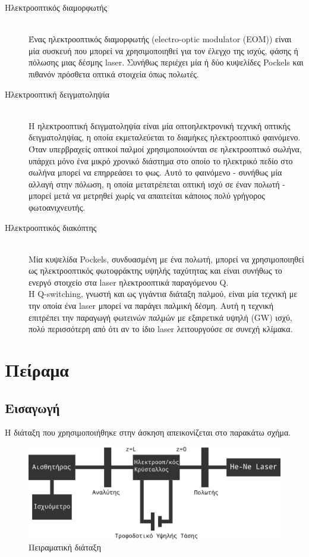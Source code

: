 \documentclass[a4paper,11pt,titlepage]{article}
\begin{document}
\begin{description}
\item[Ηλεκτροοπτικός διαμορφωτής] \hfill \\
Ένας ηλεκτροοπτικός διαμορφωτής (electro-optic modulator (EOM)) είναι μία συσκευή που μπορεί να χρησιμοποιηθεί για τον έλεγχο της ισχύς, φάσης ή πόλωσης μιας δέσμης laser. Συνήθως περιέχει μία ή δύο κυψελίδες Pockels και πιθανόν πρόσθετα οπτικά στοιχεία όπως πολωτές.

\item[Ηλεκτροοπτική δειγματοληψία] \hfill \\
Η ηλεκτροοπτική δειγματοληψία είναι μία οπτοηλεκτρονική τεχνική οπτικής δειγματοληψίας, η οποία εκμεταλεύεται το διαμήκες ηλεκτροοπτικό φαινόμενο. Όταν υπερβραχείς οπτικοί παλμοί χρησιμοποιούνται σε ηλεκτροοπτικό σωλήνα, υπάρχει μόνο ένα μικρό χρονικό διάστημα στο οποίο το ηλεκτρικό πεδίο στο σωλήνα μπορεί να επηρρεάσει το φως. Αυτό το φαινόμενο - συνήθως μία αλλαγή στην πόλωση, η οποία μετατρέπεται οπτική ισχύ σε έναν πολωτή - μπορεί μετά να μετρηθεί χωρίς να απαιτείται κάποιος πολύ γρήγορος φωτοανιχνευτής.

\item[Ηλεκτροοπτικός διακόπτης] \hfill \\
Μία κυψελίδα Pockels, συνδυασμένη με ένα πολωτή, μπορεί να χρησιμοποιηθεί ως ηλεκτροοπτικός φωτοφράκτης υψηλής ταχύτητας  και είναι συνήθως το ενεργό στοιχείο στα laser ηλεκτροοπτικά παραγόμενου Q. \\Η Q-switching, γνωστή και ως γιγάντια διάταξη παλμού, είναι μία τεχνική με την οποία ένα laser μπορεί να παράγει παλμική δέσμη. Αυτή η τεχνική επιτρέπει την παραγωγή φωτεινών παλμών με εξαιρετικά υψηλή (GW) ισχύ, πολύ περισσότερη από ότι αν το ίδιο laser λειτουργούσε σε συνεχή κλίμακα.
\end{description}


\newpage
\section{Πείραμα}
\subsection{Εισαγωγή}
H διάταξη που χρησιμοποιήθηκε στην άσκηση απεικονίζεται στο παρακάτω σχήμα. 
\begin{figure} [hp]
\centering
\includegraphics[width=120mm]{diataksh.png}
\caption{Πειραματική διάταξη}
\end{figure}
\end{document}
